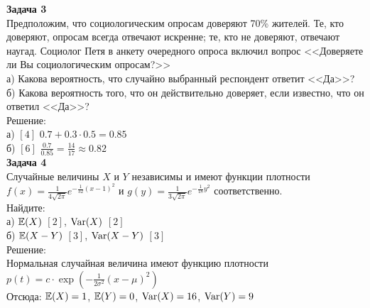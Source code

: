 \documentclass[pdftex,12pt,a4paper]{article}
\begin{document}



\textbf{Задача 3} \\ %
Предположим, что социологическим опросам доверяют 70\% жителей. Те, кто доверяют, опросам всегда отвечают искренне; те, кто не доверяют, отвечают наугад. Социолог Петя  в анкету очередного опроса включил вопрос <<Доверяете ли Вы социологическим опросам?>> \\
а) Какова вероятность, что случайно выбранный респондент ответит <<Да>>? \\
б) Какова вероятность того, что он действительно доверяет, если известно, что он ответил <<Да>>? \\
Решение: \\
а) $[4]$ $0.7+0.3\cdot0.5=0.85$ \\
б) $[6]$ $\frac{0.7}{0.85}=\frac{14}{17}\approx 0.82$ \\


\textbf{Задача 4} \\
Случайные величины $X$ и $Y$ независимы и имеют функции плотности $f(x)=\frac{1}{4\sqrt{2\pi } } e^{-\frac{1}{32} (x-1)^{2} }$ и $g(y)=\frac{1}{3\sqrt{2\pi } } e^{-\frac{1}{18} y^{2} }$ соответственно. \\
Найдите: \\
а) $\mathbb{E}(X)$ $[2]$, $\operatorname{Var}(X)$ $[2]$ \\
б) $\mathbb{E}(X-Y)$ $[3]$, $\operatorname{Var}(X-Y)$ $[3]$ \\
Решение: \\
Нормальная случайная величина имеют функцию плотности $p(t)=c\cdot \exp(-\frac{1}{2\sigma^{2}}(x-\mu)^{2})$ \\
Отсюда: $\mathbb{E}(X)=1$, $\mathbb{E}(Y)=0$, $\operatorname{Var}(X)=16$, $\operatorname{Var}(Y)=9$ \\


\end{document}
